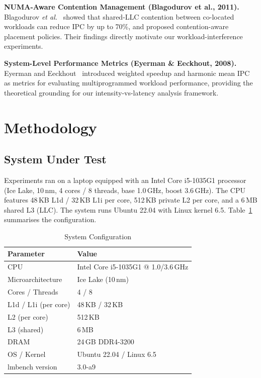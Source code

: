 \documentclass[conference]{IEEEtran}
\begin{document}
\textbf{NUMA-Aware Contention Management (Blagodurov et al., 2011).}
Blagodurov \textit{et al.}~\cite{blagodurov2011numa} showed that shared-LLC
contention between co-located workloads can reduce IPC by up to 70\%, and
proposed contention-aware placement policies.  Their findings directly motivate
our workload-interference experiments.

\textbf{System-Level Performance Metrics (Eyerman \& Eeckhout, 2008).}
Eyerman and Eeckhout~\cite{eyerman2008system} introduced weighted speedup and
harmonic mean IPC as metrics for evaluating multiprogrammed workload
performance, providing the theoretical grounding for our intensity-vs-latency
analysis framework.

\section{Methodology}
\label{sec:methodology}

\subsection{System Under Test}
Experiments ran on a laptop equipped with an Intel Core i5-1035G1 processor
(Ice Lake, 10\,nm, 4 cores / 8 threads, base 1.0\,GHz, boost 3.6\,GHz).
The CPU features 48\,KB L1d / 32\,KB L1i per core, 512\,KB private L2 per
core, and a 6\,MB shared L3 (LLC).  The system runs Ubuntu 22.04 with Linux
kernel 6.5.  Table~\ref{tab:sysconfig} summarises the configuration.

\begin{table}[h]
\centering
\caption{System Configuration}
\label{tab:sysconfig}
\begin{tabular}{ll}
\toprule
\textbf{Parameter} & \textbf{Value} \\
\midrule
CPU                & Intel Core i5-1035G1 @ 1.0/3.6\,GHz \\
Microarchitecture  & Ice Lake (10\,nm) \\
Cores / Threads    & 4 / 8 \\
L1d / L1i (per core)& 48\,KB / 32\,KB \\
L2 (per core)      & 512\,KB \\
L3 (shared)        & 6\,MB \\
DRAM               & 24\,GB DDR4-3200 \\
OS / Kernel        & Ubuntu 22.04 / Linux 6.5 \\
lmbench version    & 3.0-a9 \\
\bottomrule
\end{tabular}
\end{table}
\end{document}
